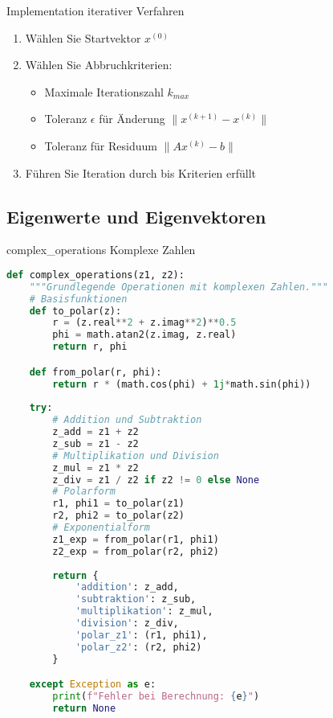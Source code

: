 \begin{KR}{Implementation iterativer Verfahren}
\begin{enumerate}
    \item Wählen Sie Startvektor $x^{(0)}$
    \item Wählen Sie Abbruchkriterien:
        \begin{itemize}
            \item Maximale Iterationszahl $k_{max}$
            \item Toleranz $\epsilon$ für Änderung $\|x^{(k+1)} - x^{(k)}\|$
            \item Toleranz für Residuum $\|Ax^{(k)} - b\|$
        \end{itemize}
    \item Führen Sie Iteration durch bis Kriterien erfüllt
\end{enumerate}
\end{KR}

\subsection{Eigenwerte und Eigenvektoren}

\begin{examplecode}{complex\_operations} Komplexe Zahlen
\begin{lstlisting}[language=Python, style=basesmol]
def complex_operations(z1, z2):
    """Grundlegende Operationen mit komplexen Zahlen."""
    # Basisfunktionen
    def to_polar(z):
        r = (z.real**2 + z.imag**2)**0.5
        phi = math.atan2(z.imag, z.real)
        return r, phi

    def from_polar(r, phi):
        return r * (math.cos(phi) + 1j*math.sin(phi))
    
    try:
        # Addition und Subtraktion
        z_add = z1 + z2
        z_sub = z1 - z2
        # Multiplikation und Division
        z_mul = z1 * z2
        z_div = z1 / z2 if z2 != 0 else None
        # Polarform
        r1, phi1 = to_polar(z1)
        r2, phi2 = to_polar(z2)
        # Exponentialform
        z1_exp = from_polar(r1, phi1)
        z2_exp = from_polar(r2, phi2)
        
        return {
            'addition': z_add,
            'subtraktion': z_sub,
            'multiplikation': z_mul,
            'division': z_div,
            'polar_z1': (r1, phi1),
            'polar_z2': (r2, phi2)
        }

    except Exception as e:
        print(f"Fehler bei Berechnung: {e}")
        return None
\end{lstlisting}
\end{examplecode}

